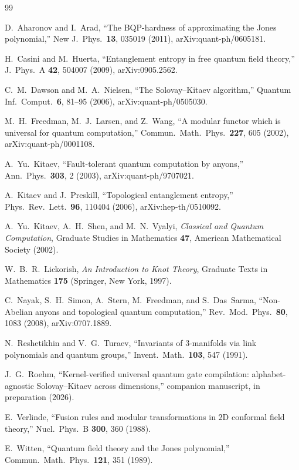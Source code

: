 \documentclass[aps,prx,nofootinbib,superscriptaddress,12pt]{revtex4-2}
\begin{document}
\begin{thebibliography}{99}

D.~Aharonov and I.~Arad,
``The BQP-hardness of approximating the Jones polynomial,''
New J.\ Phys.\ \textbf{13}, 035019 (2011),
arXiv:quant-ph/0605181.

H.~Casini and M.~Huerta,
``Entanglement entropy in free quantum field theory,''
J.\ Phys.\ A \textbf{42}, 504007 (2009),
arXiv:0905.2562.

C.~M.~Dawson and M.~A.~Nielsen,
``The Solovay--Kitaev algorithm,''
Quantum Inf.\ Comput.\ \textbf{6}, 81--95 (2006),
arXiv:quant-ph/0505030.

M.~H.~Freedman, M.~J.~Larsen, and Z.~Wang,
``A modular functor which is universal for quantum computation,''
Commun.\ Math.\ Phys.\ \textbf{227}, 605 (2002),
arXiv:quant-ph/0001108.

A.~Yu.~Kitaev,
``Fault-tolerant quantum computation by anyons,''
Ann.\ Phys.\ \textbf{303}, 2 (2003),
arXiv:quant-ph/9707021.

A.~Kitaev and J.~Preskill,
``Topological entanglement entropy,''
Phys.\ Rev.\ Lett.\ \textbf{96}, 110404 (2006),
arXiv:hep-th/0510092.

A.~Yu.~Kitaev, A.~H.~Shen, and M.~N.~Vyalyi,
\emph{Classical and Quantum Computation},
Graduate Studies in Mathematics \textbf{47}, American Mathematical
Society (2002).

W.~B.~R.~Lickorish,
\emph{An Introduction to Knot Theory},
Graduate Texts in Mathematics \textbf{175}
(Springer, New York, 1997).

C.~Nayak, S.~H.~Simon, A.~Stern, M.~Freedman, and S.~Das~Sarma,
``Non-Abelian anyons and topological quantum computation,''
Rev.\ Mod.\ Phys.\ \textbf{80}, 1083 (2008),
arXiv:0707.1889.

N.~Reshetikhin and V.~G.~Turaev,
``Invariants of $3$-manifolds via link polynomials and quantum groups,''
Invent.\ Math.\ \textbf{103}, 547 (1991).

J.~G.~Roehm,
``Kernel-verified universal quantum gate compilation:
alphabet-agnostic Solovay--Kitaev across dimensions,''
companion manuscript, in preparation (2026).

E.~Verlinde,
``Fusion rules and modular transformations in $2$D conformal field
theory,''
Nucl.\ Phys.\ B \textbf{300}, 360 (1988).

E.~Witten,
``Quantum field theory and the Jones polynomial,''
Commun.\ Math.\ Phys.\ \textbf{121}, 351 (1989).

\end{thebibliography}
\end{document}
